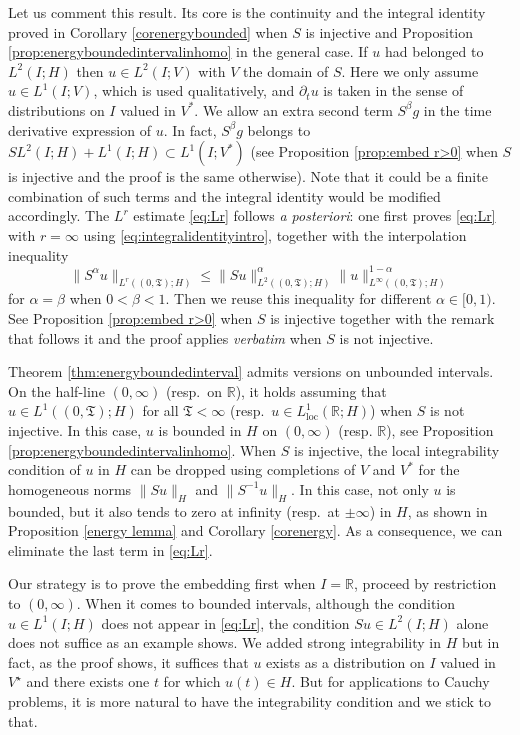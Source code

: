 \documentclass[11pt, letterpaper]{amsart}
\theoremstyle{definition}
\theoremstyle{remark}
\numberwithin{equation}{section}
\begin{document}
Let us comment this result. Its core is the continuity and the integral identity proved in  Corollary \ref{corenergybounded} when $S$ is injective and  Proposition \ref{prop:energyboundedintervalinhomo} in the general case. If $u$ had belonged to $L^2(I;H)$ then $u\in L^2(I;V)$ with $V$ the domain of $S$. Here we only assume $u\in L^1(I;V)$, which is used qualitatively,  and $\partial_{t}u$ is  taken in the sense of distributions on $I$ valued in $V^*$.  
We allow an extra second term $S^\beta g$ in  the time derivative expression of $u$. In fact, $S^\beta g$ belongs to $SL^2(I;H)+ L^1(I;H)\subset L^1(I; V^*)$ (see Proposition \ref{prop:embed r>0} when $S$ is injective and the proof is the same otherwise).  Note that it could be a finite combination of such terms and the integral identity would  be modified accordingly. 
The $L^r$ estimate \eqref{eq:Lr} follows  \textit{a posteriori}: one first proves \eqref{eq:Lr} with  
$r=\infty$ using
   \eqref{eq:integralidentityintro},  together with  the  interpolation inequality 
$$
 \| S^\alpha u \|_{L^r((0,\mathfrak{T});H)} \le \|Su \|_{L^2((0,\mathfrak{T});H)}^\alpha \|u \|_{L^\infty((0,\mathfrak{T});H)}^{1-\alpha}  
 $$ 
 for $\alpha=\beta$ when $0<\beta<1$. Then we reuse this inequality for different $\alpha\in[0,1)$. See  Proposition \ref{prop:embed r>0} when $S$ is injective together with the remark that follows it and the proof applies \textit{verbatim} when $S$ is not injective. 



Theorem \ref{thm:energyboundedinterval} admits versions on unbounded intervals.  On the half-line $(0, \infty)$ (resp.~on $\mathbb{R}$), it holds  assuming  that $u \in L^1((0, \mathfrak{T}); H)$ for all $\mathfrak{T} < \infty$ (resp.~$u \in L^1_{\mathrm{loc}}(\mathbb{R}; H)$) when $S$ is not injective. In this case, $u$ is bounded in $H$ on $(0, \infty)$ (resp. $\mathbb{R}$), {see Proposition \ref{prop:energyboundedintervalinhomo}}. 
When $S$ is injective, the local integrability condition of $u$ in $H$ can be dropped using completions of $V$ and $V^*$ for the homogeneous norms $\|Su\|_{H}$ and $\|S^{-1}u\|_{H}$.  In this case, not only $u$ is bounded, but it also tends to zero at infinity (resp.~at $\pm \infty$) in $H$, as shown in Proposition \ref{energy lemma} and Corollary \ref{corenergy}. As a consequence, we can eliminate the last term  in \eqref{eq:Lr}. 

Our strategy is to prove the embedding first  when $I = \mathbb{R}$, proceed by restriction to $(0,\infty)$.  
When it comes to bounded intervals, although the condition $u\in L^1(I;H)$ does not appear in \eqref{eq:Lr},  the condition  $Su\in L^2(I;H)$ alone does not suffice as an example shows. We added strong integrability  in $H$ but in fact, as the proof shows, it suffices that $u$ exists as a distribution on $I$ valued in $V^\star$ and there exists one $t$ for which $u(t)\in H$. But for applications to Cauchy problems, it is more natural to have the integrability condition and we stick to that. 
\end{document}
